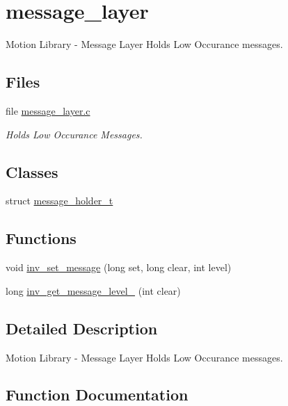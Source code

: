 \hypertarget{group___message___layer}{}\section{message\+\_\+layer}
\label{group___message___layer}


Motion Library -\/ Message Layer Holds Low Occurance messages.  


\subsection*{Files}
\begin{DoxyCompactItemize}
\item 
file \hyperlink{message__layer_8c}{message\+\_\+layer.\+c}
\begin{DoxyCompactList}\small\item\em Holds Low Occurance Messages. \end{DoxyCompactList}\end{DoxyCompactItemize}
\subsection*{Classes}
\begin{DoxyCompactItemize}
\item 
struct \hyperlink{structmessage__holder__t}{message\+\_\+holder\+\_\+t}
\end{DoxyCompactItemize}
\subsection*{Functions}
\begin{DoxyCompactItemize}
\item 
void \hyperlink{group___message___layer_gaf61231cf7b03c6b7b67b6d3c4330cef9}{inv\+\_\+set\+\_\+message} (long set, long clear, int level)
\item 
long \hyperlink{group___message___layer_ga3064fea9d7ab633e85dd76987daa1314}{inv\+\_\+get\+\_\+message\+\_\+level\+\_} (int clear)
\end{DoxyCompactItemize}


\subsection{Detailed Description}
Motion Library -\/ Message Layer Holds Low Occurance messages. 



\subsection{Function Documentation}
\hypertarget{group___message___layer_ga3064fea9d7ab633e85dd76987daa1314}{}
